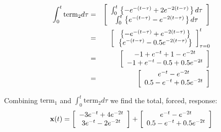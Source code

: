\begin{eqnarray*}
	\int_0^t {{\rm{term}}_2 d\tau }  & = & \left[ {\begin{array}{*{20}c}
	   {\int_0^t {\left. {\left\{ { - e^{ - (t - \tau )}  + 2e^{ - 2(t - \tau )} } \right.} \right\}d\tau } }  \\
	   {\int_0^t {\left. {\left\{ {e^{ - (t - \tau )}  - e^{ - 2(t - \tau )} } \right.} \right\}d\tau } }  \\
	\end{array}} \right] \\
	& = &
	  \left[ {\begin{array}{*{20}c}
	   {\left. {\left\{ { - e^{ - (t - \tau )}  + e^{ - 2(t - \tau )} } \right.} \right\}}  \\
	   {\left. {\left\{ {e^{ - (t - \tau )}  - 0.5e^{ - 2(t - \tau )} } \right.} \right\}}  \\
	\end{array}} \right]_{\tau  = 0}^t  \\
	 & = & \left[ {\begin{array}{*{20}c}
	   { - 1 + e^{ - t}  + 1 - e^{ - 2t} }  \\
	   { - 1 + e^{ - t}  - 0.5 + 0.5e^{ - 2t} }  \\
	\end{array}} \right] \\
	 &  = & \left[ {\begin{array}{*{20}c}
	   {e^{ - t}  - e^{ - 2t} }  \\
	   {0.5 - e^{ - t}  + 0.5e^{ - 2t} }  \\
	\end{array}} \right]
\end{eqnarray*}

Combining $\mathrm{term}_1$ and $\int_0^t \mathrm{term}_2 d\tau$ we find the total, forced, response:
\[
{\bf{x}}(t) = \left[ {\begin{array}{*{20}c}
   { - 3e^{ - t}  + 4e^{ - 2t} }  \\
   {3e^{ - t}  - 2e^{ - 2t} }  \\
\end{array}} \right] + \left[ {\begin{array}{*{20}c}
   {e^{ - t}  - e^{ - 2t} }  \\
   {0.5 - e^{ - t}  + 0.5e^{ - 2t} }  \\
\end{array}} \right]
\]

